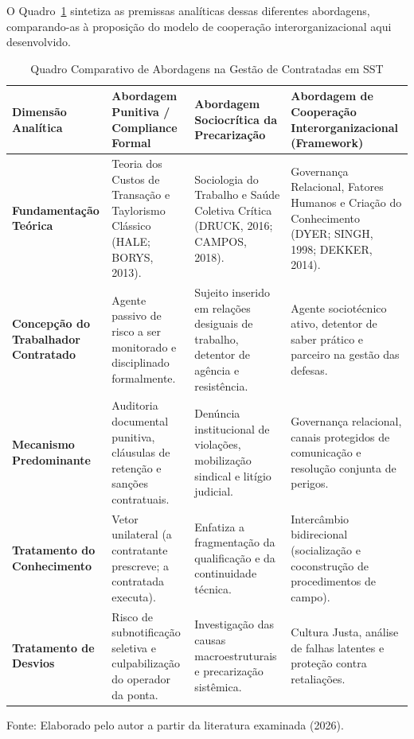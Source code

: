 \documentclass[12pt,a4paper]{article}
\begin{document}
O Quadro~\ref{tab:comparativo} sintetiza as premissas analíticas dessas diferentes abordagens, comparando-as à proposição do modelo de cooperação interorganizacional aqui desenvolvido.

\begin{table}[htbp]
\centering
\small\singlespacing
\caption{Quadro Comparativo de Abordagens na Gestão de Contratadas em SST}
\label{tab:comparativo}
\begin{tabularx}{\textwidth}{p{3.2cm}Xp{4.2cm}p{3.2cm}}
\toprule
\textbf{Dimensão Analítica} & \textbf{Abordagem Punitiva / Compliance Formal} & \textbf{Abordagem Sociocrítica da Precarização} & \textbf{Abordagem de Cooperação Interorganizacional (Framework)} \\
\midrule
\textbf{Fundamentação Teórica} & Teoria dos Custos de Transação e Taylorismo Clássico (HALE; BORYS, 2013). & Sociologia do Trabalho e Saúde Coletiva Crítica (DRUCK, 2016; CAMPOS, 2018). & Governança Relacional, Fatores Humanos e Criação do Conhecimento (DYER; SINGH, 1998; DEKKER, 2014). \\
\addlinespace
\textbf{Concepção do Trabalhador Contratado} & Agente passivo de risco a ser monitorado e disciplinado formalmente. & Sujeito inserido em relações desiguais de trabalho, detentor de agência e resistência. & Agente sociotécnico ativo, detentor de saber prático e parceiro na gestão das defesas. \\
\addlinespace
\textbf{Mecanismo Predominante} & Auditoria documental punitiva, cláusulas de retenção e sanções contratuais. & Denúncia institucional de violações, mobilização sindical e litígio judicial. & Governança relacional, canais protegidos de comunicação e resolução conjunta de perigos. \\
\addlinespace
\textbf{Tratamento do Conhecimento} & Vetor unilateral (a contratante prescreve; a contratada executa). & Enfatiza a fragmentação da qualificação e da continuidade técnica. & Intercâmbio bidirecional (socialização e coconstrução de procedimentos de campo). \\
\addlinespace
\textbf{Tratamento de Desvios} & Risco de subnotificação seletiva e culpabilização do operador da ponta. & Investigação das causas macroestruturais e precarização sistêmica. & Cultura Justa, análise de falhas latentes e proteção contra retaliações. \\
\bottomrule
\end{tabularx}
\begin{flushleft}
\footnotesize Fonte: Elaborado pelo autor a partir da literatura examinada (2026).
\end{flushleft}
\end{table}
\end{document}
